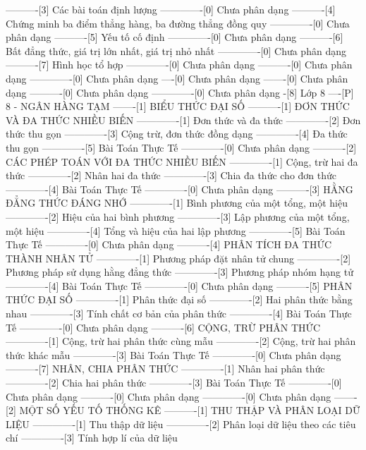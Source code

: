 ----------[3] Các bài toán định lượng
-------------[0] Chưa phân dạng
----------[4] Chứng minh ba điểm thẳng hàng, ba đường thẳng đồng quy
-------------[0] Chưa phân dạng
----------[5] Yếu tố cố định
-------------[0] Chưa phân dạng
----------[6] Bất đẳng thức, giá trị lớn nhất, giá trị nhỏ nhất
-------------[0] Chưa phân dạng
----------[7] Hình học tổ hợp
-------------[0] Chưa phân dạng
----------[0] Chưa phân dạng
-------------[0] Chưa phân dạng
----[0] Chưa phân dạng
-------[0] Chưa phân dạng
----------[0] Chưa phân dạng
-------------[0] Chưa phân dạng
-[8] Lớp 8
----[P] 8 - NGÂN HÀNG TẠM
-------[1] BIỂU THỨC ĐẠI SỐ
----------[1] ĐƠN THỨC VÀ ĐA THỨC NHIỀU BIẾN
-------------[1] Đơn thức và đa thức
-------------[2] Đơn thức thu gọn
-------------[3] Cộng trừ, đơn thức đồng dạng
-------------[4] Đa thức thu gọn
-------------[5] Bài Toán Thực Tế
-------------[0] Chưa phân dạng
----------[2] CÁC PHÉP TOÁN VỚI ĐA THỨC NHIỀU BIẾN
-------------[1] Cộng, trừ hai đa thức
-------------[2] Nhân hai đa thức
-------------[3] Chia đa thức cho đơn thức
-------------[4] Bài Toán Thực Tế
-------------[0] Chưa phân dạng
----------[3] HẰNG ĐẲNG THỨC ĐÁNG NHỚ
-------------[1] Bình phương của một tổng, một hiệu
-------------[2] Hiệu của hai bình phương
-------------[3] Lập phương của một tổng, một hiệu
-------------[4] Tổng và hiệu của hai lập phương
-------------[5] Bài Toán Thực Tế
-------------[0] Chưa phân dạng
----------[4] PHÂN TÍCH ĐA THỨC THÀNH NHÂN TỬ
-------------[1] Phương pháp đặt nhân tử chung
-------------[2] Phương pháp sử dụng hằng đẳng thức
-------------[3] Phương pháp nhóm hạng tử
-------------[4] Bài Toán Thực Tế
-------------[0] Chưa phân dạng
----------[5] PHÂN THỨC ĐẠI SỐ
-------------[1] Phân thức đại số
-------------[2] Hai phân thức bằng nhau
-------------[3] Tính chất cơ bản của phân thức
-------------[4] Bài Toán Thực Tế
-------------[0] Chưa phân dạng
----------[6] CỘNG, TRỪ PHÂN THỨC
-------------[1] Cộng, trừ hai phân thức cùng mẫu
-------------[2] Cộng, trừ hai phân thức khác mẫu
-------------[3] Bài Toán Thực Tế
-------------[0] Chưa phân dạng
----------[7] NHÂN, CHIA PHÂN THỨC
-------------[1] Nhân hai phân thức
-------------[2] Chia hai phân thức
-------------[3] Bài Toán Thực Tế
-------------[0] Chưa phân dạng
----------[0] Chưa phân dạng
-------------[0] Chưa phân dạng
-------[2] MỘT SỐ YẾU TỐ THỐNG KÊ
----------[1] THU THẬP VÀ PHÂN LOẠI DỮ LIỆU
-------------[1] Thu thập dữ liệu
-------------[2] Phân loại dữ liệu theo các tiêu chí
-------------[3] Tính hợp lí của dữ liệu
